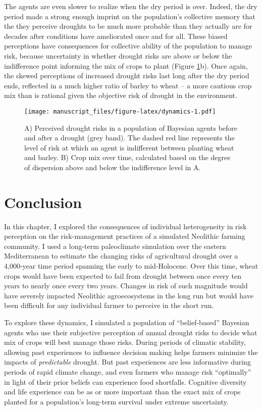 \documentclass[smallextended]{svjour3}       %
\begin{document}
The agents are even slower to realize when the dry period is over. Indeed, the dry period made a strong enough imprint on the population's collective memory that the they perceive droughts to be much more probable than they actually are for decades after conditions have ameliorated once and for all. These biased perceptions have consequences for collective ability of the population to manage risk, because uncertainty in whether drought risks are above or below the indifference point informing the mix of crops to plant (Figure \ref{fig:dynamics}b). Once again, the skewed perceptions of increased drought risks last long after the dry period ends, reflected in a much higher ratio of barley to wheat -- a more cautious crop mix than is rational given the objective risk of drought in the environment.

\begin{figure}
\centering
\texttt{[image: manuscript\_files/figure-latex/dynamics-1.pdf]}
\caption{\label{fig:dynamics}A) Perceived drought risks in a population of Bayesian agents before and after a drought (grey band). The dashed red line represents the level of risk at which an agent is indifferent between planting wheat and barley. B) Crop mix over time, calculated based on the degree of dispersion above and below the indifference level in A.}
\end{figure}

\hypertarget{conclusion}{%
\section{Conclusion}\label{conclusion}}

In this chapter, I explored the consequences of individual heterogeneity in risk perception on the risk-management practices of a simulated Neolithic farming community. I used a long-term paleoclimate simulation over the eastern Mediterranean to estimate the changing risks of agricultural drought over a 4,000-year time period spanning the early to mid-Holocene. Over this time, wheat crops would have been expected to fail from drought between once every ten years to nearly once every two years. Changes in risk of such magnitude would have severely impacted Neolithic agroecosystems in the long run but would have been difficult for any individual farmer to perceive in the short run.

To explore these dynamics, I simulated a population of ``belief-based'' Bayesian agents who use their subjective perception of annual drought risks to decide what mix of crops will best manage those risks. During periods of climatic stability, allowing past experiences to influence decision making helps farmers minimize the impacts of \emph{predictable} drought. But past experiences are less informative during periods of rapid climate change, and even farmers who manage risk ``optimally'' in light of their prior beliefs can experience food shortfalls. Cognitive diversity and life experience can be as or more important than the exact mix of crops planted for a population's long-term survival under extreme uncertainty.
\end{document}

